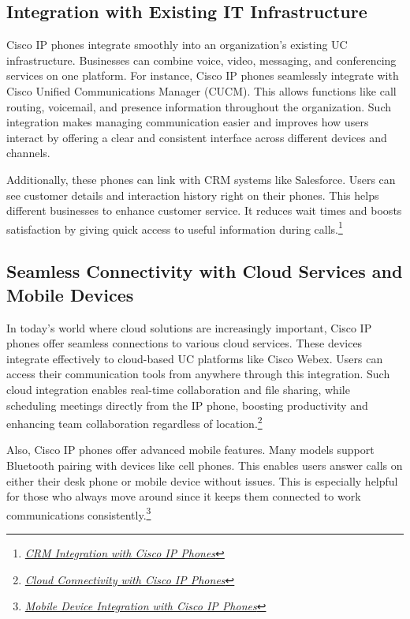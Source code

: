 \documentclass[11pt,a4paper]{article}
\begin{document}
\subsection*{Integration with Existing IT Infrastructure}

Cisco IP phones integrate smoothly into an organization’s existing UC infrastructure. Businesses can combine voice, video, messaging, and conferencing services on one platform. For instance, Cisco IP phones seamlessly integrate with Cisco Unified Communications Manager (CUCM). This allows functions like call routing, voicemail, and presence information throughout the organization. Such integration makes managing communication easier and improves how users interact by offering a clear and consistent interface across different devices and channels.

Additionally, these phones can link with CRM systems like Salesforce. Users can see customer details and interaction history right on their phones. This helps different businesses to enhance customer service. It reduces wait times and boosts satisfaction by giving quick access to useful information during calls.\footnote{\href{https://www.cisco.com/c/dam/en/us/td/docs/voice_ip_comm/cucallconnectors/UCC_for_MS_CRM/Rel_30/marketing_source/30mkting.pdf}{\textit{CRM Integration with Cisco IP Phones}}}

\subsection*{Seamless Connectivity with Cloud Services and Mobile Devices}

In today’s world where cloud solutions are increasingly important, Cisco IP phones offer seamless connections to various cloud services. These devices integrate effectively to cloud-based UC platforms like Cisco Webex. Users can access their communication tools from anywhere through this integration. Such cloud integration enables real-time collaboration and file sharing, while scheduling meetings directly from the IP phone, boosting productivity and enhancing team collaboration regardless of location.\footnote{\href{https://www.cisco.com/c/en/us/products/unified-communications/webex-calling/index.html}{\textit{Cloud Connectivity with Cisco IP Phones}}}

Also, Cisco IP phones offer advanced mobile features. Many models support Bluetooth pairing with devices like cell phones. This enables users answer calls on either their desk phone or mobile device without issues. This is especially helpful for those who always move around since it keeps them connected to work communications consistently.\footnote{\href{https://www.cisco.com/c/en/us/support/docs/smb/collaboration-endpoints/cisco-ip-phone-8800-series/smb5670-configure-a-mobile-device-with-cisco-ip-phone-8800-series-mu.pdf}{\textit{Mobile Device Integration with Cisco IP Phones}}}
\end{document}
